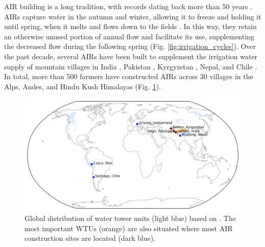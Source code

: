 \ac{AIR} building is a long tradition, with records dating back more than 50 years
\citep{nusserSociohydrologyArtificialGlaciers2019}. \ac{AIRs} capture water in the autumn and winter, allowing
it to freeze and holding it until spring, when it melts and flows down to the fields
\citep{ipccChapterHighMountain2019, vinceGlacierMan2009, clouseLadakhArtificialGlaciers2017,
nusserSociohydrologyArtificialGlaciers2019}. In this way, they retain an otherwise unused portion of annual
flow and facilitate its use, supplementing the decreased flow during the following spring (Fig.
\ref{fig:irrigation_cycles}). Over the past decade, several \ac{AIRs} have been built to supplement the
irrigation water supply of mountain villages in India \citep{wangchukIceStupaCompetition2020,
palmerStoringFrozenWater2022, aggarwalAdaptationClimateChange2021}, Pakistan
\citep{awazproductionIceStupaArtificial2022}, Kyrgyzstan \citep{bbcnewsBrightArtificialGlacier2020}, Nepal, and
Chile \citep{reutersConservationistsChileAim2021}. In total, more than 500 farmers have constructed AIRs across
30 villages in the Alps, Andes, and Hindu Kush Himalayas (Fig. \ref{fig:WTUs_AIRs}).

\begin{figure}[htb]
	\centering
	\includegraphics[width=\textwidth]{figs/WTUs_AIRs.jpg}

	\caption{ Global distribution of water tower units (light blue) based on
		\citet{immerzeelImportanceVulnerabilityWorld2020}. The most important \ac{WTUs} (orange) are also situated where most 
		AIR construction sites  are located (dark blue). }

	\label{fig:WTUs_AIRs}
\end{figure}

